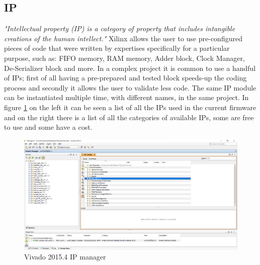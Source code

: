 \subsection{IP}
\noindent \textit{"Intellectual property (IP) is a category of property that includes intangible creations of the human intellect."}
\newline
Xilinx allows the user to use pre-configured pieces of code that were written by expertises specifically for a particular purpose, such as: FIFO memory, RAM memory, Adder block, Clock Manager, De-Serializer block and more.
In a complex project it is common to use a handful of IPs; first of all having a pre-prepared and tested block speeds-up the coding process and secondly it allows the user to validate less code. The same IP module can be instantiated multiple time, with different names, in the same project. In figure \ref{fig:ip}  on the left it can be seen a list of all the IPs used in the current firmware and on the right there is a list of all the categories of available IPs, some are free to use and some have a cost.
\begin{figure}[H]
	\centering
	\includegraphics[width=0.7\linewidth]{IMG/ch3/IP}
	\caption{Vivado 2015.4 IP manager}
	\label{fig:ip}
\end{figure} 

